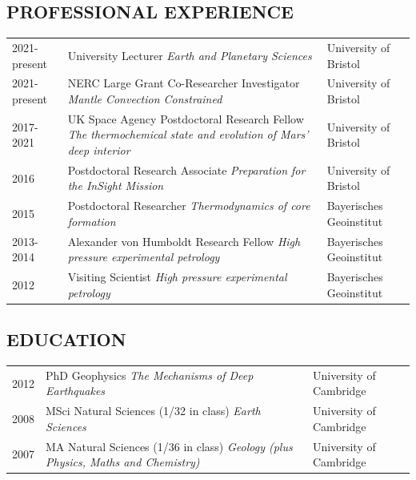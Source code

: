\documentclass[11pt,twoside,a4paper]{article}
\begin{document}
\subsection*{PROFESSIONAL EXPERIENCE}
\vspace{-0.5em}
\begin{table}[!h]
\centering
\begin{tabular}{L{2cm} L{10.5cm} L{4.5cm}}
2021-present & University Lecturer \newline \emph{Earth and Planetary Sciences} & University of Bristol \vfill \\
2021-present & NERC Large Grant Co-Researcher Investigator \newline \emph{Mantle Convection Constrained} & University of Bristol \vfill \\
2017-2021 & UK Space Agency Postdoctoral Research Fellow \newline \emph{The thermochemical state and evolution of Mars' deep interior} & University of Bristol \vfill \\
2016 \vfill & Postdoctoral Research Associate \newline \emph{Preparation for the InSight Mission} & University of Bristol \vfill \\
2015 \vfill & Postdoctoral Researcher \newline \emph{Thermodynamics of core formation} & Bayerisches Geoinstitut \vfill \\
2013-2014 \vfill & Alexander von Humboldt Research Fellow \newline \emph{High pressure experimental petrology} & Bayerisches Geoinstitut \vfill \\
2012 \vfill & Visiting Scientist \newline \emph{High pressure experimental petrology} & Bayerisches Geoinstitut \vfill
\end{tabular}
\end{table}
\vspace{-1.5em}

\subsection*{EDUCATION}
\vspace{-0.5em}
\begin{table}[!h]
\centering
\begin{tabular}{L{2cm} L{10.5cm} L{4.5cm}}
2012 \vfill & PhD Geophysics \newline \emph{The Mechanisms of Deep Earthquakes} & University of Cambridge\vfill \\
2008 \vfill & MSci Natural Sciences (1/32 in class) \newline \emph{Earth Sciences} & University of Cambridge \vfill\\
2007 \vfill & MA Natural Sciences (1/36 in class) \newline \emph{Geology (plus Physics, Maths and Chemistry)} & University of Cambridge \vfill
\end{tabular}
\end{table}
\vspace{-1.5em}
\end{document}
